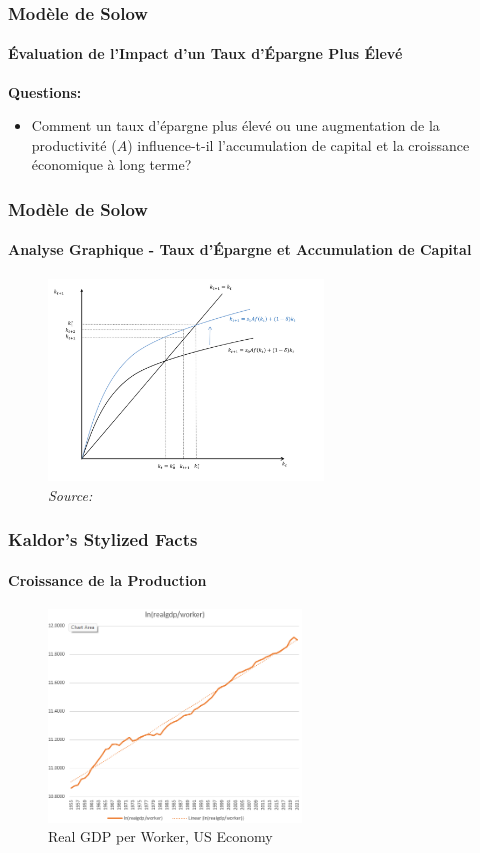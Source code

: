 \documentclass{beamer}
\begin{document}
\begin{frame}
    \frametitle{Modèle de Solow}
    \framesubtitle{Évaluation de l'Impact d'un Taux d'Épargne Plus Élevé}
    \textbf{Questions:} 
    \begin{itemize}
        \item 
        Comment un taux d'épargne plus élevé
        ou une augmentation de la productivité  (\( A \))
         influence-t-il l'accumulation de capital et 
        la croissance économique à long terme?
    \end{itemize}
\end{frame}

\begin{frame}
    \frametitle{Modèle de Solow}
    \framesubtitle{Analyse Graphique - Taux d'Épargne et Accumulation de Capital}

    \begin{figure}
        \centering
        \includegraphics[width=0.65\textwidth]{graphs/ss_solow_s2.png} %
        \caption{
            \footnotesize \textit{Source: }\textcite{Garin_etal_2021}
        }
    \end{figure}
\end{frame}



\begin{frame}
    \frametitle{Kaldor's Stylized Facts}
    \hypertarget{growth}{} %
    \framesubtitle{Croissance de la Production}
        \begin{figure}
            \centering
            \includegraphics[width=0.6\textwidth]{graphs/lnrgdp_usa.png}
            \caption{Real GDP per Worker, US Economy
            \hyperlink{kaldor}{}}
        \end{figure}
\end{frame}
\end{document}
